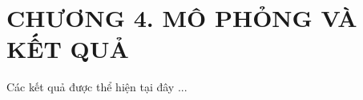 \section*{CHƯƠNG 4. MÔ PHỎNG VÀ KẾT QUẢ}
\setcounter{section}{4}
    \setcounter{figure}{0}
        \setcounter{table}{0}
            \setcounter{equation}{0}


Các kết quả được thể hiện tại đây ...